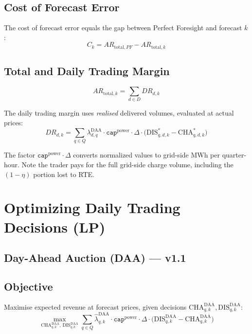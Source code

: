 \documentclass{article}
\numberwithin{equation}{subsection}
\begin{document}
\subsection{Cost of Forecast Error}
The cost of forecast error equals the gap between Perfect Foresight and forecast \(k\):
\begin{equation}
C_k = AR_{\text{total}, PF} - AR_{\text{total},k}
\end{equation}

\subsection{Total and Daily Trading Margin}
\begin{equation}
AR_{\text{total}, k} = \sum_{d \in D} DR_{d, k}
\end{equation}

The daily trading margin uses \emph{realised} delivered volumes, evaluated at actual prices:
\begin{equation}
DR_{d, k} = \sum_{q\in Q} \lambda^{\text{DAA}}_{d,q} \cdot \texttt{cap}^{\text{power}} \cdot \Delta \cdot
\bigl(\mathrm{DIS}^{*}_{q,d,k} - \mathrm{CHA}^{*}_{q,d,k}\bigr)
\label{eq:daily-margin}
\end{equation}

The factor \(\texttt{cap}^{\text{power}}\cdot\Delta\) converts normalized values to grid-side MWh per quarter-hour. Note the trader pays for the full grid-side charge volume, including the \((1-\eta)\) portion lost to RTE.


\section{Optimizing Daily Trading Decisions (LP)}

\subsection{Day-Ahead Auction (DAA) --- v1.1}

\subsection*{Objective}
Maximise expected revenue at forecast prices, given decisions \(\mathrm{CHA}^{\mathrm{DAA}}_{q,k}, \mathrm{DIS}^{\mathrm{DAA}}_{q,k}\):
\begin{equation}
\operatorname*{max}_{\mathrm{CHA}^{\mathrm{DAA}}_{q,k},\,\mathrm{DIS}^{\mathrm{DAA}}_{q,k}}
\sum_{q\in Q} \hat{\lambda}^{\mathrm{DAA}}_{q,k} \cdot \texttt{cap}^{\text{power}} \cdot \Delta \cdot
\bigl(\mathrm{DIS}^{\mathrm{DAA}}_{q,k}-\mathrm{CHA}^{\mathrm{DAA}}_{q,k}\bigr)
\end{equation}
\end{document}
